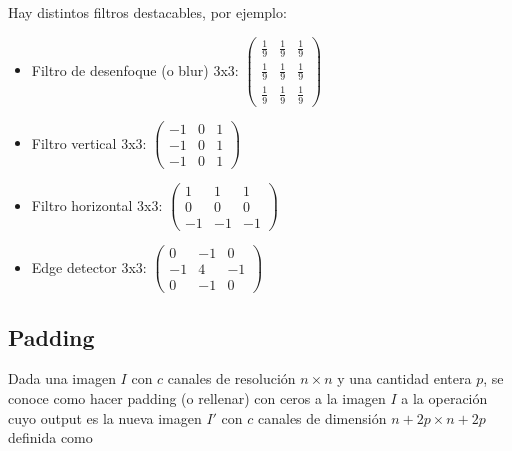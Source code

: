 \documentclass{article}
\begin{document}
Hay distintos filtros destacables, por ejemplo:
\begin{itemize}
\item Filtro de desenfoque (o blur) 3x3: $\begin{pmatrix}
\frac{1}{9} & \frac{1}{9} & \frac{1}{9}\\
\frac{1}{9} & \frac{1}{9} & \frac{1}{9}\\
\frac{1}{9} & \frac{1}{9} & \frac{1}{9}
\end{pmatrix}$

\item Filtro vertical 3x3: $\begin{pmatrix}
-1 & 0 & 1\\
-1 & 0 & 1\\
-1 & 0 & 1
\end{pmatrix}$

\item Filtro horizontal 3x3: $\begin{pmatrix}
1 & 1 & 1\\
0 & 0 & 0\\
-1 & -1 & -1
\end{pmatrix}$

\item Edge detector 3x3: $\begin{pmatrix}
0 & -1 & 0\\
-1 & 4 & -1\\
0 & -1 & 0
\end{pmatrix}$


\end{itemize}



\subsection{Padding}
Dada una imagen $I$ con $c$ canales de resolución $n\times n$ y una cantidad entera $p$, se conoce como hacer padding (o rellenar) con ceros a la imagen $I$ a la operación cuyo output es la nueva imagen $I'$ con $c$ canales de dimensión $n+2p\times n+2p$ definida como
\end{document}
